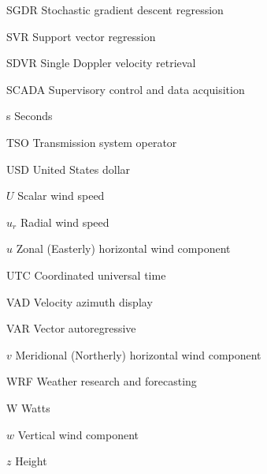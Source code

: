 \begin{abbreviations}
\item[SGDR] Stochastic gradient descent regression
\item[SVR] Support vector regression
\item[SDVR] Single Doppler velocity retrieval
\item[SCADA] Supervisory control and data acquisition
\item[s] Seconds

\item[TSO] Transmission system operator

\item[USD] United States dollar
\item[$U$] Scalar wind speed
\item[$u_r$] Radial wind speed
\item[$u$] Zonal (Easterly) horizontal wind component
\item[UTC] Coordinated universal time

\item[VAD] Velocity azimuth display
\item[VAR] Vector autoregressive
\item[$v$] Meridional (Northerly) horizontal wind component

\item[WRF] Weather research and forecasting
\item[W] Watts
\item[$w$] Vertical wind component

\item[$z$] Height

\end{abbreviations} 